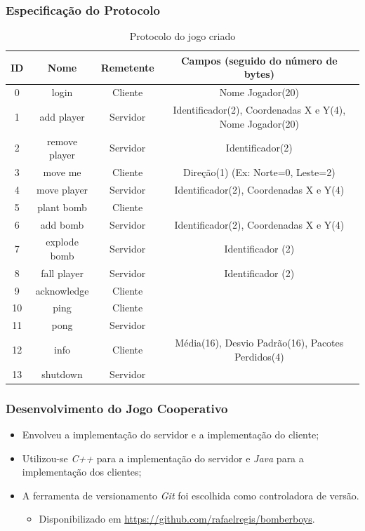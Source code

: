 \documentclass{beamer}
\begin{document}
\begin{frame} \frametitle{Especificação do Protocolo}
\begin{table}
  \center
  \tiny
  \begin{tabular}{|c|c|c|c|}
  \hline
    \textbf{ID} & \textbf{Nome} & \textbf{Remetente} & \textbf{Campos (seguido do número de bytes)} \\ \hline
    0 & login & Cliente & Nome Jogador(20)  \\ \hline
    1 & add player & Servidor & Identificador(2), Coordenadas X e Y(4), Nome Jogador(20)\\ \hline
    2 & remove player & Servidor & Identificador(2) \\ \hline
    3 & move me & Cliente & Direção(1) (Ex: Norte=0, Leste=2) \\ \hline
    4 & move player & Servidor & Identificador(2), Coordenadas X e Y(4) \\ \hline
    5 & plant bomb & Cliente & \\ \hline
    6 & add bomb & Servidor &  Identificador(2), Coordenadas X e Y(4)  \\ \hline
    7 & explode bomb & Servidor & Identificador (2) \\ \hline
    8 & fall player & Servidor & Identificador (2) \\ \hline
    9 & acknowledge & Cliente & \\ \hline
   10 & ping & Cliente & \\ \hline
   11 & pong & Servidor & \\ \hline
   12 & info & Cliente & Média(16), Desvio Padrão(16), Pacotes Perdidos(4)  \\ \hline
   13 & shutdown & Servidor &\\ \hline
  \end{tabular} 
\caption{Protocolo do jogo criado}
\label{tab:protocolo}
\end{table} 
\end{frame}

\begin{frame} \frametitle{Desenvolvimento do Jogo Cooperativo}
\begin{itemize}
	\item \justifying Envolveu a implementação do servidor e a implementação do cliente;
	\item \justifying Utilizou-se \emph{C++} \cite{CPP} para a implementação do servidor e \emph{Java} \cite{Java} para a implementação dos
clientes;
	\item \justifying A ferramenta de versionamento \emph{Git} \cite{Git} foi escolhida como controladora de versão.
	\begin{itemize}
		\item Disponibilizado em \url{https://github.com/rafaelregis/bomberboys}.
	\end{itemize}
\end{itemize}
\end{frame}
\end{document}
